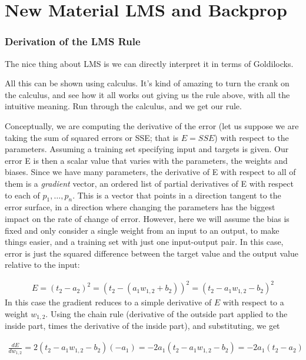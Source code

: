\chapter{New Material LMS and Backprop}

\subsection{Derivation of the LMS Rule}

The nice thing about LMS is we can directly interpret it in terms of Goldilocks.

All this can be shown using calculus. It's kind of amazing to turn the crank on the calculus, and see how it all works out giving us the rule above, with all the intuitive meaning. Run through the calculus, and we get our rule. 

Conceptually, we are computing the derivative of the error (let us suppose we are taking the sum of squared errors or SSE; that is $E = SSE$) with respect to the parameters. Assuming a training set specifying input and targets is given. Our error E is then a scalar value that varies with the parameters, the weights and biases. Since we have many parameters, the derivative of E with respect to all of them is a \emph{gradient} vector, an ordered list of partial derivatives of E with respect to each of $p_1,\dots, p_n$.  This is a vector that points in a direction tangent to the error surface, in a direction where changing the parameters has the biggest impact on the rate of change of error.  However, here we will assume the bias is fixed and only consider a single weight from an input to an output, to make things easier, and a training set with just one input-output pair.  In this case, error is just the squared difference between the target value and the output value relative to the input:

\begin{eqnarray*}
E = (t_2 - a_2)^2  =  (t_2 - ( a_1 w_{1,2} + b_2))^2  =  (t_2 -  a_1 w_{1,2} -  b_2)^2 
\end{eqnarray*}
In this case the gradient reduces to a simple derivative of $E$ with respect to a weight $w_{1,2}$.  Using the chain rule (derivative of the outside part applied to the inside part, times the derivative of the inside part), and substituting, we get

\begin{eqnarray*}
\frac{dE}{dw_{1,2}} = 2 (t_2 - a_1 w_{1,2} - b_2) (-a_1) =  -2 a_1 (t_2 - a_1 w_{1,2} - b_2) =  -2 a_1 (t_2 - a_2)
\end{eqnarray*}

